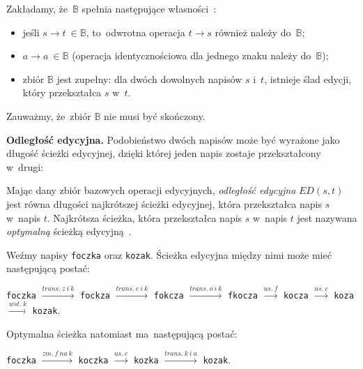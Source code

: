 \documentclass{praca1}
\begin{document}
\begin{property}\label{wl:001}
Zakładamy, że~$\mathbb{B}$ spełnia następujące własności~\cite{Boytsov2011:indexingmethods}:
\begin{itemize}
\item jeśli $s \rightarrow t~\in \mathbb{B}$, to~odwrotna operacja $t \rightarrow s$ również należy do~$\mathbb{B}$;
\item $a \rightarrow a~\in \mathbb{B}$ (operacja identycznościowa dla jednego znaku należy do~$\mathbb{B}$);
\item zbiór $\mathbb{B}$ jest zupełny: dla dwóch dowolnych napisów $s$ i~$t$, istnieje ślad edycji, który przekształca $s$ w~$t$.
\end{itemize}
\end{property}

Zauważmy, że~zbiór $\mathbb{B}$ nie musi być skończony.

\textbf{Odległość edycyjna.} Podobieństwo dwóch napisów może być wyrażone jako długość ścieżki edycyjnej, dzięki której jeden napis zostaje przekształcony w~drugi:

\begin{definition}
Mając dany zbiór bazowych operacji edycyjnych, \emph{odległość edycyjna} $ED(s,t)$ jest równa długości najkrótszej ścieżki edycyjnej, która przekształca napis $s$ w~napis $t$. Najkrótsza ścieżka, która przekształca napis $s$ w~napis $t$ jest nazywana \emph{optymalną} ścieżką edycyjną~\cite{Boytsov2011:indexingmethods}. 
\end{definition}

\begin{example}
Weźmy napisy \verb|foczka| oraz \verb|kozak|. Ścieżka edycyjna między nimi może mieć następującą postać:

\verb|foczka|  $\xrightarrow{trans.\ z\ i\ k}$ \verb|fockza| $\xrightarrow{trans.\ c\ i\ k}$ \verb|fokcza| $\xrightarrow{trans.\ o\ i\ k}$ \verb|fkocza| $\xrightarrow{us.\ f}$ \verb|kocza| $\xrightarrow{us.\ c}$ \verb|koza| $\xrightarrow{wst.\ k}$ \verb|kozak|.

Optymalna ścieżka natomiast ma~następującą postać:

\verb|foczka| $\xrightarrow{zm.\ f\ na\ k}$ \verb|koczka|  $\xrightarrow{us.\ c}$ \verb|kozka| $\xrightarrow{trans.\ k\ i\ a}$ \verb|kozak|.

\end{example}
\end{document}
